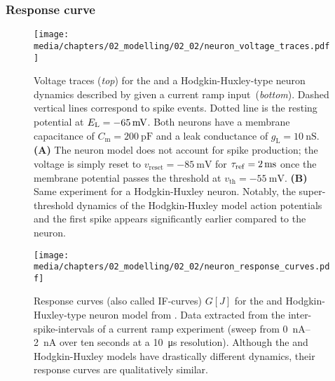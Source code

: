 \subsubsection{Response curve}

\begin{figure}
	\centering
	\texttt{[image: media/chapters/02\_modelling/02\_02/neuron\_voltage\_traces.pdf]}
	\caption[Voltage traces for the LIF and Hodgkin-Huxley neuron model]{Voltage traces (\emph{top}) for the \LIF and a Hodgkin-Huxley-type neuron dynamics described by \citet{traub1991neuronal} given a current ramp input~(\emph{bottom}). Dashed vertical lines correspond to spike events. Dotted line is the resting potential at $E_\mathrm{L}=\SI{-65}{\milli\volt}$. Both neurons have a membrane capacitance of $C_\mathrm{m} = \SI{200}{\pico\farad}$ and a leak conductance of $g_\mathrm{L} = \SI{10}{\nano\siemens}$. \textbf{(A)} The \LIF neuron model does not account for spike production; the voltage is simply reset to $v_\mathrm{reset} = \SI{-85}{\milli\volt}$ for ${\tau_\mathrm{ref}} = \SI{2}{\milli\second}$ once the membrane potential passes the threshold at $v_\mathrm{th} = -\SI{55}{\milli\volt}$. \textbf{(B)} Same experiment for a Hodgkin-Huxley neuron. Notably, the super-threshold dynamics of the Hodgkin-Huxley model action potentials and the first spike appears significantly earlier compared to the \LIF neuron.}
	\label{fig:neuron_voltage_traces}
\end{figure}

\begin{figure}
	\centering
	\texttt{[image: media/chapters/02\_modelling/02\_02/neuron\_response\_curves.pdf]}%
	{\label{fig:neuron_response_curves_lif}}%
	{\label{fig:neuron_response_curves_hh}}%
	\caption[Response curves for the LIF and Hodgkin-Huxley-type neuron model]{Response curves (also called IF-curves) $G[J]$ for the \LIF and Hodgkin-Huxley-type neuron model from . Data extracted from the inter-spike-intervals of a current ramp experiment (sweep from \SIrange{0}{2}{\nano\ampere} over ten seconds at a \SI{10}{\micro\second} resolution). Although the \LIF and Hodgkin-Huxley models have drastically different dynamics, their response curves are qualitatively similar.}
	\label{fig:neuron_response_curves}
\end{figure}

